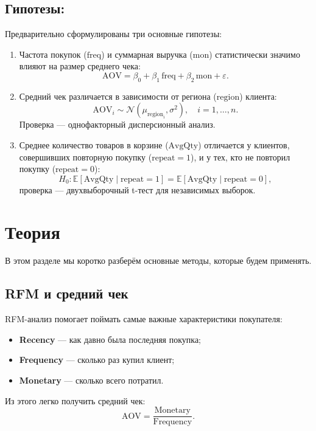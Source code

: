 \documentclass[a4paper]{article}
\begin{document}
\subsection*{Гипотезы:}
Предварительно сформулированы три основные гипотезы:

\begin{enumerate}
  \item Частота покупок ($\mathrm{freq}$) и суммарная выручка ($\mathrm{mon}$) статистически значимо влияют на размер среднего чека:
    \[
      \mathrm{AOV} = \beta_0 + \beta_1\,\mathrm{freq} + \beta_2\,\mathrm{mon} + \varepsilon.
    \]

  \item Средний чек различается в зависимости от региона (\(\mathrm{region}\)) клиента:
    \[
      \mathrm{AOV}_i \sim \mathcal{N}(\mu_{\mathrm{region}_i}, \sigma^2),
      \quad i=1,\dots,n.
    \]
    Проверка — однофакторный дисперсионный анализ.

  \item Среднее количество товаров в корзине (\(\mathrm{AvgQty}\)) отличается у клиентов, совершивших повторную покупку (\(\mathrm{repeat}=1\)), и у тех, кто не повторил покупку (\(\mathrm{repeat}=0\)):
    \[
      H_0: \mathbb{E}[\mathrm{AvgQty}\mid \mathrm{repeat}=1] = \mathbb{E}[\mathrm{AvgQty}\mid \mathrm{repeat}=0],
    \]
    проверка — двухвыборочный t-тест для независимых выборок.
\end{enumerate}

\section{Теория}

В этом разделе мы коротко разберём основные методы, которые будем применять.

\subsection{RFM и средний чек}
RFM-анализ помогает поймать самые важные характеристики покупателя:
\begin{itemize}
  \item \textbf{Recency} — как давно была последняя покупка;
  \item \textbf{Frequency} — сколько раз купил клиент;
  \item \textbf{Monetary} — сколько всего потратил.
\end{itemize}
Из этого легко получить средний чек:
\[
  \text{AOV} = \frac{\text{Monetary}}{\text{Frequency}}.
\]
\end{document}
